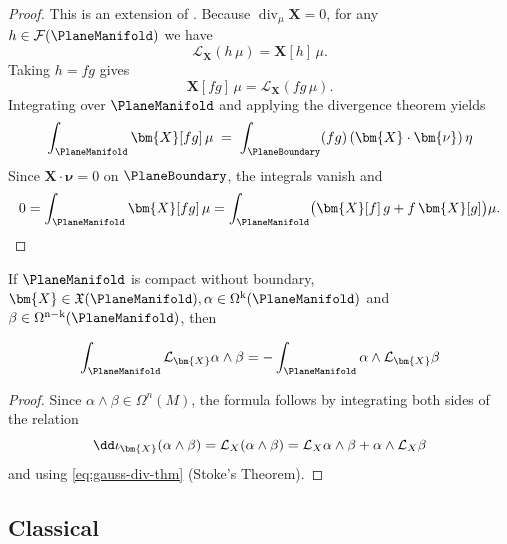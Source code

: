 \begin{proof}
This is an extension of \cite[Corollary 7.2.11]{abraham1988manifolds}. 
Because $\operatorname{div}_{\mu}\bm{X}=0$, for any $h\in\mathcal F(\PlaneManifold)$ we have
\[
\mathcal{L}_{\bm{X}}(h\,\mu)=\bm{X}[h]\,\mu.
\]
Taking $h=fg$ gives
\[
\bm{X}[fg]\,\mu
= \mathcal{L}_{\bm{X}}(fg\,\mu).
\]
Integrating over $\PlaneManifold$ and applying the divergence theorem yields
\[
\int_{\PlaneManifold} \bm{X}[fg]\,\mu
   \;=\;
\int_{\PlaneBoundary} (fg)\,(\bm{X}\cdot\bm{\nu})\,\eta
\]
Since $\bm{X} \cdot \bm{\nu}=0$ on $\PlaneBoundary$, the integrals vanish and
\[
0
=\int_{\PlaneManifold} \bm{X}[fg]\,\mu
  =\int_{\PlaneManifold} \bigl(\bm{X}[f]\,g + f\,\bm{X}[g]\bigr)\mu.
\]
\end{proof}

\begin{proposition}
\label{prop:7212}
\citep[Corollary 7.2.12]{abraham1988manifolds}
If \(\PlaneManifold\) is compact without boundary, $\bm{X} \in \mathfrak{X}(\PlaneManifold), \alpha \in \Omega^{\mathrm{k}}(\PlaneManifold)$ and $\beta \in \Omega^{\mathrm{n}-\mathrm{k}}(\PlaneManifold)$, then

$$
\int_{\PlaneManifold} \mathcal{L}_{\bm{X}} \alpha \wedge \beta=-\int_{\PlaneManifold} \alpha \wedge \mathcal{L}_{\bm{X}} \beta
$$

\end{proposition}
\begin{proof}
Since $\alpha \wedge \beta \in \Omega^n(M)$, the formula follows by integrating both sides of the relation 
\[
\dd \interior{\bm{X}}{(\alpha \wedge \beta)}=\mathcal{L}_X(\alpha \wedge \beta)=\mathcal{L}_X \alpha \wedge \beta+\alpha \wedge \mathcal{L}_X \beta
\]
and using \eqref{eq:gauss-div-thm} (Stoke's Theorem).
\end{proof}

\subsection{Classical}

